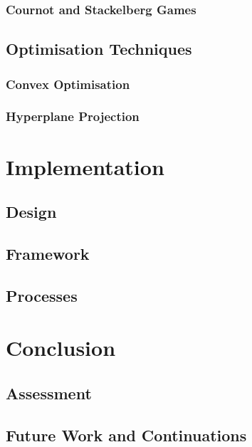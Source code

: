 \documentclass[a4paper, notitlepage]{report}
\begin{document}
\section{Cournot and Stackelberg Games}
\label{sec:org72c12c9}
\chapter{Optimisation Techniques}
\label{sec:org6177a74}
\section{Convex Optimisation}
\label{sec:orga46ecbf}
\section{Hyperplane Projection}
\label{sec:orgff4fd09}
\part{Implementation}
\label{sec:orga51a39c}
\chapter{Design}
\label{sec:org1ae0535}
\chapter{Framework}
\label{sec:org6bb7567}
\chapter{Processes}
\label{sec:orgde468b3}
\part{Conclusion}
\label{sec:orgcd39caf}
\chapter{Assessment}
\label{sec:org1d5837b}
\chapter{Future Work and Continuations}
\label{sec:orgb6bec35}
\printbibliography
\appendix
\end{document}
